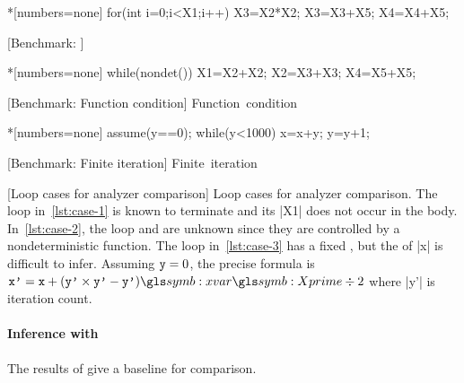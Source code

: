 \begin{center}
\captionsetup{type=figure}
\begin{minipage}{\textwidth}
\begin{minipage}[t]{.33\textwidth}
\begin{implisting}*[numbers=none]
for(int i=0;i<X1;i++)
{ X3=X2*X2;
  X3=X3+X5;
  X4=X4+X5; }
\end{implisting}
[Benchmark: \explain]{\mbox{\explain}}
\label{lst:case-1}
\end{minipage}\hfill%
\begin{minipage}[t]{.33\textwidth}
\begin{implisting}*[numbers=none]
while(nondet())
{ X1=X2+X2;
  X2=X3+X3;
  X4=X5+X5; }
\end{implisting}
[Benchmark: Function condition]
{\mbox{Function condition}}
\label{lst:case-2}
\end{minipage}\hfill%
\begin{minipage}[t]{.3\textwidth}
\begin{implisting}*[numbers=none]
assume(y==0);
while(y<1000)
{ x=x+y;
  y=y+1; }
\end{implisting}
[Benchmark: Finite iteration]
{\mbox{Finite iteration}}
\label{lst:case-3}
\end{minipage}
[Loop cases for analyzer comparison]{
Loop cases for analyzer comparison. The loop in~\ref{lst:case-1} is known to
terminate and its  \pr|X1| does not occur
in the body. In~\ref{lst:case-2}, the loop  and
 are unknown since they are controlled by a nondeterministic
function. The loop in~\ref{lst:case-3} has a fixed
, but the  of \pr|x| is
difficult to infer. Assuming \(\prm{y}=0\), the precise formula is \(\prm{x'} =
\prm{x} + (\prm{y'} \times \prm{y'} - \prm{y'})\symbo{xvar}\symbo{Xprime} \div
2\) where \pr|y'| is iteration count.
}\label{fig:loops}
\end{minipage}
\end{center}

\paragraph*{Inference with \impl}
The results of \ndx{\impl} give a baseline for comparison.

